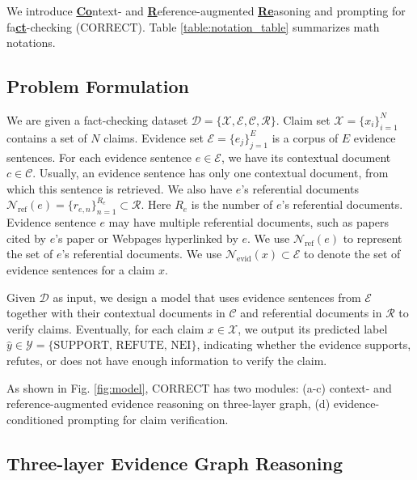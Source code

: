We introduce \ul{\textbf{Co}}ntext- and \ul{\textbf{R}}eference-augmented \ul{\textbf{Re}}asoning and prompting for fa\ul{\textbf{ct}}-checking (CORRECT). Table \ref{table:notation_table} summarizes math notations.

\subsection{Problem Formulation}

We are given a fact-checking dataset $ \mathcal{D}=\{\mathcal{X},\mathcal{E},\mathcal{C},\mathcal{R}\} $. Claim set $ \mathcal{X}=\{x_i\}_{i=1}^N $ contains a set of $ N $ claims. Evidence set $ \mathcal{E}=\{e_j\}_{j=1}^E $ is a corpus of $ E $ evidence sentences. For each evidence sentence $ e\in\mathcal{E} $, we have its contextual document $ c\in\mathcal{C} $. Usually, an evidence sentence has only one contextual document, from which this sentence is retrieved. We also have $ e $'s referential documents $ \mathcal{N}_{\text{ref}}(e)=\{r_{e,n}\}_{n=1}^{R_e}\subset\mathcal{R} $. Here $ R_e $ is the number of $ e $'s referential documents. Evidence sentence $ e $ may have multiple referential documents, such as papers cited by $ e $'s paper or Webpages hyperlinked by $ e $. We use $ \mathcal{N}_{\text{ref}}(e) $ to represent the set of $ e $'s referential documents. We use $ \mathcal{N}_{\text{evid}}(x)\subset\mathcal{E} $ to denote the set of evidence sentences for a claim $ x $.

Given $ \mathcal{D} $ as input, we design a model that uses evidence sentences from $ \mathcal{E} $ together with their contextual documents in $ \mathcal{C} $ and referential documents in $ \mathcal{R} $ to verify claims. Eventually, for each claim $ x\in\mathcal{X} $, we output its predicted label $ \hat{y}\in\mathcal{Y}=\{\text{SUPPORT, REFUTE, NEI}\} $, indicating whether the evidence supports, refutes, or does not have enough information to verify the claim.

As shown in Fig. \ref{fig:model}, CORRECT has two modules: (a-c) context- and reference-augmented evidence reasoning on three-layer graph, (d) evidence-conditioned prompting for claim verification.

\subsection{Three-layer Evidence Graph Reasoning}

